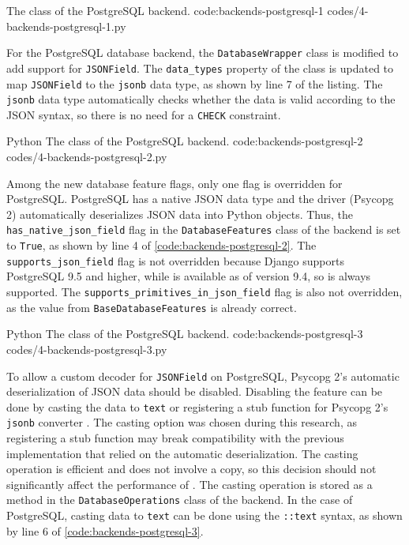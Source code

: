 {The  class of the PostgreSQL backend.}
{code:backends-postgresql-1}
{codes/4-backends-postgresql-1.py}

For the PostgreSQL database backend, the \verb|DatabaseWrapper| class is
modified to add support for \verb|JSONField|. The \verb|data_types| property of
the class is updated to map \verb|JSONField| to the \verb|jsonb| data type, as
shown by line 7 of the listing. The \verb|jsonb| data type automatically checks
whether the data is valid according to the JSON syntax, so there is no need for
a \verb|CHECK| constraint.

\listing
{Python}
{The  class of the PostgreSQL backend.}
{code:backends-postgresql-2}
{codes/4-backends-postgresql-2.py}

Among the new database feature flags, only one flag is overridden for
PostgreSQL. PostgreSQL has a native JSON data type and the driver (Psycopg 2)
automatically deserializes JSON data into Python objects. Thus, the
\verb|has_native_json_field| flag in the \verb|DatabaseFeatures| class of the
backend is set to \verb|True|, as shown by line 4 of
\autoref{code:backends-postgresql-2}. The \verb|supports_json_field| flag is
not overridden because Django supports PostgreSQL 9.5 and higher, while
 is available as of version 9.4, so  is always
supported. The \verb|supports_primitives_in_json_field| flag is also not
overridden, as the value from \verb|BaseDatabaseFeatures| is already correct.

\listing
{Python}
{The  class of the PostgreSQL backend.}
{code:backends-postgresql-3}
{codes/4-backends-postgresql-3.py}

To allow a custom decoder for \verb|JSONField| on PostgreSQL, Psycopg 2's
automatic deserialization of JSON data should be disabled. Disabling the
feature can be done by casting the data to \verb|text| or registering a stub
function for Psycopg 2's \verb|jsonb| converter
\cite{psycopg2:json-adaptation}. The casting option was chosen during this
research, as registering a stub function may break compatibility with the
previous implementation that relied on the automatic deserialization. The
casting operation is efficient and does not involve a copy, so this decision
should not significantly affect the performance of 
\cite{psycopg2:json-adaptation}. The casting operation is stored as a method in
the \verb|DatabaseOperations| class of the backend. In the case of PostgreSQL,
casting data to \verb|text| can be done using the \verb|::text| syntax, as
shown by line 6 of \autoref{code:backends-postgresql-3}.

